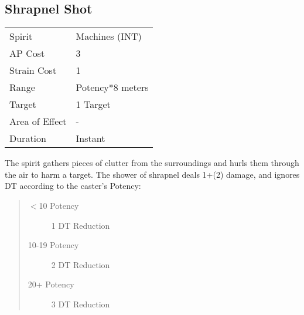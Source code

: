\documentclass[11pt,a4paper,twocolumn]{book}
\begin{document}
\vfill

\subsection*{Shrapnel Shot}
{
	\begin{tabu} to 70mm{| X[l,4] | X[l,7] |}
		\hline
		Spirit         & Machines (INT)        \\
		AP Cost        & 3                     \\
		Strain Cost    & 1                     \\
		Range          & Potency*8 meters \\
		Target         & 1 Target              \\
		Area of Effect & -                     \\
		Duration       & Instant               \\ \hline
	\end{tabu}
	
}

\medskip

The spirit gathers pieces of clutter from the surroundings and hurls them through the air to harm a target. The shower of shrapnel deals 1+(2) damage, and ignores DT according to the caster's Potency: 
\begin{quote}
	\begin{description}
		\item[$<$10 Potency] 	1 DT Reduction
		\item[10-19 Potency] 	2 DT Reduction
		\item[20+ Potency] 		3 DT Reduction
	\end{description}	
\end{quote}


%	
%
%
%
\end{document}
